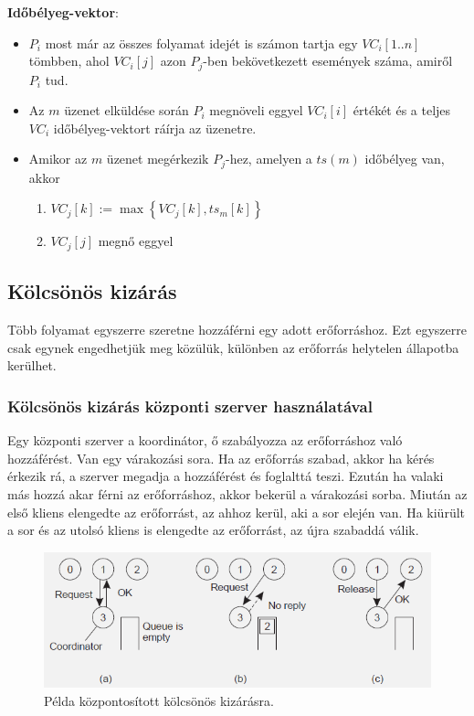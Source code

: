 \documentclass[margin=0px]{article}
\begin{document}
\noindent \textbf{Időbélyeg-vektor}:
\begin{itemize}
    \item	$P_{i}$ most már az összes folyamat idejét is számon tartja egy $VC_{i}[1..n]$ tömbben, ahol
          $VC_{i}[j]$ azon $P_{j}$-ben bekövetkezett események száma, amiről $P_{i}$ tud.

    \item	Az $m$ üzenet elküldése során $P_{i}$ megnöveli eggyel $VC_{i}[i]$ értékét és a teljes $VC_{i}$
          időbélyeg-vektort ráírja az üzenetre.

    \item	Amikor az $m$ üzenet megérkezik $P_{j}$-hez, amelyen a $ts(m)$ időbélyeg van, akkor
          \begin{enumerate}
              \item	$VC_{j}[k] := \max \left\{VC_{j}[k], ts_{m}[k]\right\}$
              \item	$VC_{j}[j]$ megnő eggyel
          \end{enumerate}
\end{itemize}

\subsection{Kölcsönös kizárás}

Több folyamat egyszerre szeretne hozzáférni egy adott erőforráshoz. Ezt egyszerre csak egynek engedhetjük meg
közülük, különben az erőforrás helytelen állapotba kerülhet.

\subsubsection{Kölcsönös kizárás központi szerver használatával}

Egy központi szerver a koordinátor, ő szabályozza az erőforráshoz való hozzáférést. Van egy várakozási sora.
Ha az erőforrás szabad, akkor ha kérés érkezik rá, a szerver megadja a hozzáférést és foglalttá teszi. Ezután
ha valaki más hozzá akar férni az erőforráshoz, akkor bekerül a várakozási sorba. Miután az első kliens
elengedte az erőforrást, az ahhoz kerül, aki a sor elején van. Ha kiürült a sor és az utolsó kliens is
elengedte az erőforrást, az újra szabaddá válik.

\begin{figure}[H]
    \centering
    \includegraphics[width=0.6\linewidth]{img/kolcskizar_kozp}
    \caption{Példa központosított kölcsönös kizárásra.}
    \label{fig:kolcskizar_kozp}
\end{figure}
\end{document}
